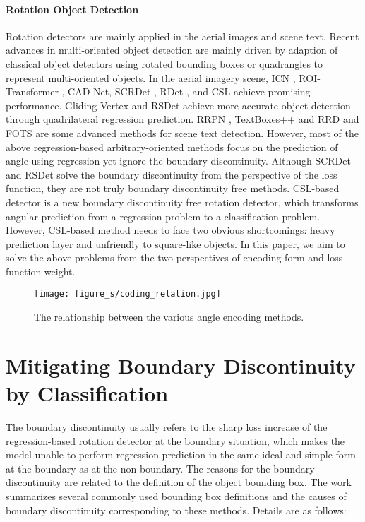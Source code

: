 \documentclass[final]{cvpr}
\begin{document}
\paragraph{Rotation Object Detection}
Rotation detectors are mainly applied in the aerial images and scene text. Recent advances in multi-oriented object detection are mainly driven by adaption of classical object detectors using rotated bounding boxes or quadrangles to represent multi-oriented objects. In the aerial imagery scene, ICN \cite{azimi2018towards}, ROI-Transformer \cite{ding2018learning}, CAD-Net\cite{zhang2019cad}, SCRDet \cite{yang2019scrdet}, RDet \cite{yang2019r3det}, and CSL \cite{yang2020arbitrary} achieve promising performance. Gliding Vertex \cite{xu2020gliding} and RSDet \cite{qian2019learning} achieve more accurate object detection through quadrilateral regression prediction. RRPN \cite{ma2018arbitrary}, TextBoxes++ \cite{liao2018textboxes++} and RRD \cite{liao2018rotation} and FOTS \cite{liu2018fots} are some advanced methods for scene text detection. However, most of the above regression-based arbitrary-oriented methods focus on the prediction of angle using regression yet ignore the boundary discontinuity. Although SCRDet and RSDet solve the boundary discontinuity from the perspective of the loss function, they are not truly boundary discontinuity free methods. CSL-based detector is a new boundary discontinuity free rotation detector, which transforms angular prediction from a regression problem to a classification problem. However, CSL-based method needs to face two obvious shortcomings: heavy prediction layer and unfriendly to square-like objects. In this paper, we aim to solve the above problems from the two perspectives of encoding form and loss function weight.

\begin{figure}[!tb]
	\centering
	\texttt{[image: figure\_s/coding\_relation.jpg]}
	\caption{The relationship between the various angle encoding methods.}
	\label{fig:coding_relation}
	\vspace{-10pt}
\end{figure}

\section{Mitigating Boundary Discontinuity by Classification}\label{sec:bkgn}
The boundary discontinuity \cite{yang2019scrdet, yang2020arbitrary, yang2020on} usually refers to the sharp loss increase of the regression-based rotation detector at the boundary situation, which makes the model unable to perform regression prediction in the same ideal and simple form at the boundary as at the non-boundary. The reasons for the boundary discontinuity are related to the definition of the object bounding box. The work \cite{yang2020arbitrary} summarizes several commonly used bounding box definitions and the causes of boundary discontinuity corresponding to these methods. Details are as follows:
\end{document}
